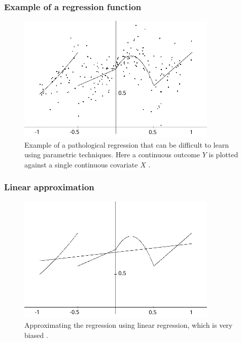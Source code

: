 \documentclass{beamer}
\begin{document}
\begin{frame}
    \frametitle{Example of a regression function}
    \begin{figure}[H]
        \centering
        \includegraphics[width=0.85\textwidth]{figures/trueregression}
        \caption{Example of a pathological regression that can be difficult to learn using parametric techniques. Here a continuous outcome $ Y $ is plotted against a single continuous covariate $ X $ \citep{gyorfi2002distribution}.}
    \end{figure}
\end{frame}

\begin{frame}
    \frametitle{Linear approximation}
    \begin{figure}[H]
        \centering
        \includegraphics[width=0.85\textwidth]{figures/linearestimate}
        \caption{Approximating the regression using linear regression, which is very biased \citep{gyorfi2002distribution}.}
    \end{figure}
\end{frame}
\end{document}
